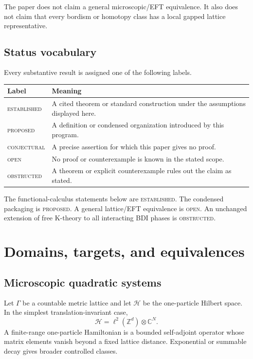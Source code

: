 \documentclass[12pt]{article}
\theoremstyle{definition}
\theoremstyle{remark}
\newcommand{\status}[1]{\textsc{#1}}
\newcommand{\Z}{\mathbb Z}
\newcommand{\C}{\mathbb C}
\begin{document}
The paper does not claim a general microscopic/EFT equivalence.
It also does not claim that every bordism or homotopy class has a local
gapped lattice representative.

\subsection{Status vocabulary}

Every substantive result is assigned one of the following labels.

\begin{center}
\begin{tabular}{p{}p{}}
\toprule
Label & Meaning \\
\midrule
\status{established} & A cited theorem or standard construction under the assumptions displayed here.\\
\status{proposed} & A definition or condensed organization introduced by this program.\\
\status{conjectural} & A precise assertion for which this paper gives no proof.\\
\status{open} & No proof or counterexample is known in the stated scope.\\
\status{obstructed} & A theorem or explicit counterexample rules out the claim as stated.\\
\bottomrule
\end{tabular}
\end{center}

The functional-calculus statements below are \status{established}.
The condensed packaging is \status{proposed}.
A general lattice/EFT equivalence is \status{open}.
An unchanged extension of free K-theory to all interacting BDI phases is
\status{obstructed}.

\section{Domains, targets, and equivalences}

\subsection{Microscopic quadratic systems}

Let $\Gamma$ be a countable metric lattice and let $\mathcal H$ be the
one-particle Hilbert space.
In the simplest translation-invariant case,
\[
\mathcal H=\ell^2(\Z^d)\otimes\C^N.
\]
A finite-range one-particle Hamiltonian is a bounded self-adjoint operator
whose matrix elements vanish beyond a fixed lattice distance.
Exponential or summable decay gives broader controlled classes.
\end{document}
